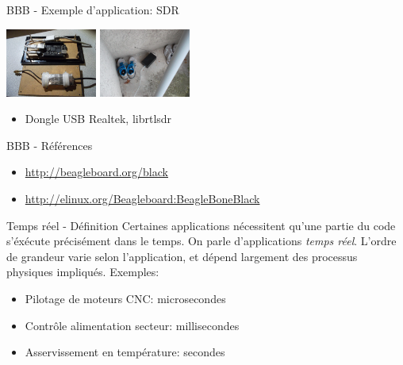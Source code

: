 \documentclass{beamer}
\begin{document}
\begin{frame}{BBB - Exemple d'application: SDR}

  \begin{center}
    \includegraphics[width=30mm]{./pic/sdrbox_inside.jpg}
    \hspace{2.00mm}
    \includegraphics[width=30mm]{./pic/sdrbox_outside.jpg}
  \end{center}

  \begin{small}
    \begin{itemize}
    \item Dongle USB Realtek, librtlsdr
    \end{itemize}
  \end{small}

\end{frame}


\begin{frame}{BBB - R\'{e}f\'{e}rences}
  \begin{small}
    \begin{itemize}
    \item \url{http://beagleboard.org/black}
    \item \url{http://elinux.org/Beagleboard:BeagleBoneBlack}
    \end{itemize}
  \end{small}
\end{frame}


\begin{frame}{Temps r\'eel - D\'efinition}
  Certaines applications n\'ecessitent qu'une partie du code s'\'ex\'ecute
  pr\'ecis\'ement dans le temps. On parle d'applications \textit{temps r\'eel}.
  \newline
  \newline
  L'ordre de grandeur varie selon l'application, et d\'epend largement des
  processus physiques impliqu\'es.
  \newline
  \newline
  Exemples:
  \begin{itemize}
  \item Pilotage de moteurs CNC: microsecondes
  \item Contr\^ole alimentation secteur: millisecondes
  \item Asservissement en temp\'{e}rature: secondes
  \end{itemize}
\end{frame}
\end{document}
